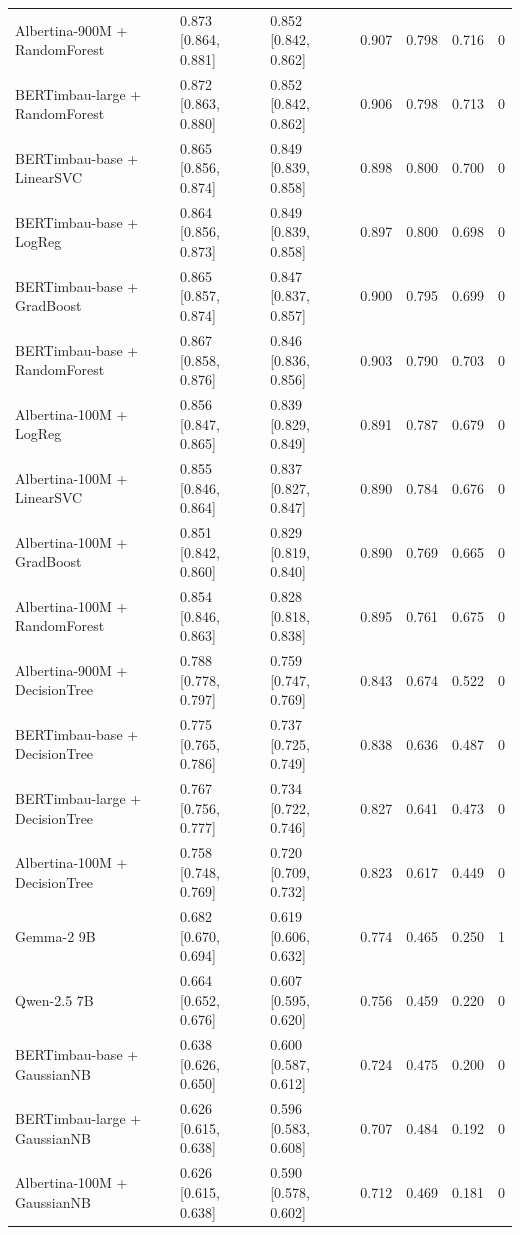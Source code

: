 \begin{table}[t]
\begin{tabular}{lllrrrr}
Albertina-900M + RandomForest & 0.873 [0.864, 0.881] & 0.852 [0.842, 0.862] & 0.907 & 0.798 & 0.716 & 0 \\
BERTimbau-large + RandomForest & 0.872 [0.863, 0.880] & 0.852 [0.842, 0.862] & 0.906 & 0.798 & 0.713 & 0 \\
BERTimbau-base + LinearSVC & 0.865 [0.856, 0.874] & 0.849 [0.839, 0.858] & 0.898 & 0.800 & 0.700 & 0 \\
BERTimbau-base + LogReg & 0.864 [0.856, 0.873] & 0.849 [0.839, 0.858] & 0.897 & 0.800 & 0.698 & 0 \\
BERTimbau-base + GradBoost & 0.865 [0.857, 0.874] & 0.847 [0.837, 0.857] & 0.900 & 0.795 & 0.699 & 0 \\
BERTimbau-base + RandomForest & 0.867 [0.858, 0.876] & 0.846 [0.836, 0.856] & 0.903 & 0.790 & 0.703 & 0 \\
Albertina-100M + LogReg & 0.856 [0.847, 0.865] & 0.839 [0.829, 0.849] & 0.891 & 0.787 & 0.679 & 0 \\
Albertina-100M + LinearSVC & 0.855 [0.846, 0.864] & 0.837 [0.827, 0.847] & 0.890 & 0.784 & 0.676 & 0 \\
Albertina-100M + GradBoost & 0.851 [0.842, 0.860] & 0.829 [0.819, 0.840] & 0.890 & 0.769 & 0.665 & 0 \\
Albertina-100M + RandomForest & 0.854 [0.846, 0.863] & 0.828 [0.818, 0.838] & 0.895 & 0.761 & 0.675 & 0 \\
Albertina-900M + DecisionTree & 0.788 [0.778, 0.797] & 0.759 [0.747, 0.769] & 0.843 & 0.674 & 0.522 & 0 \\
BERTimbau-base + DecisionTree & 0.775 [0.765, 0.786] & 0.737 [0.725, 0.749] & 0.838 & 0.636 & 0.487 & 0 \\
BERTimbau-large + DecisionTree & 0.767 [0.756, 0.777] & 0.734 [0.722, 0.746] & 0.827 & 0.641 & 0.473 & 0 \\
Albertina-100M + DecisionTree & 0.758 [0.748, 0.769] & 0.720 [0.709, 0.732] & 0.823 & 0.617 & 0.449 & 0 \\
Gemma-2 9B & 0.682 [0.670, 0.694] & 0.619 [0.606, 0.632] & 0.774 & 0.465 & 0.250 & 1 \\
Qwen-2.5 7B & 0.664 [0.652, 0.676] & 0.607 [0.595, 0.620] & 0.756 & 0.459 & 0.220 & 0 \\
BERTimbau-base + GaussianNB & 0.638 [0.626, 0.650] & 0.600 [0.587, 0.612] & 0.724 & 0.475 & 0.200 & 0 \\
BERTimbau-large + GaussianNB & 0.626 [0.615, 0.638] & 0.596 [0.583, 0.608] & 0.707 & 0.484 & 0.192 & 0 \\
Albertina-100M + GaussianNB & 0.626 [0.615, 0.638] & 0.590 [0.578, 0.602] & 0.712 & 0.469 & 0.181 & 0 \\

\end{tabular}
\end{table}

